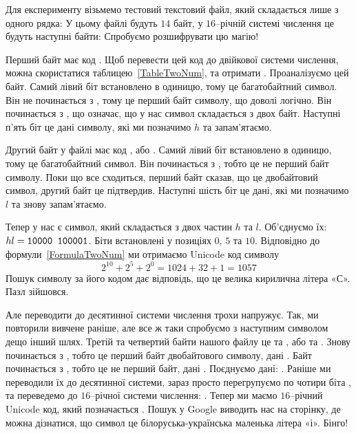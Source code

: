 Для експерименту візьмемо тестовий текстовий файл, який складається лише з одного рядка:
\noindent У цьому файлі будуть $14$ байт, у $16$--річній системі числення це будуть наступні байти:
\noindent Спробуємо розшифрувати цю магію!

Перший байт має код .
Щоб перевести цей код до двійкової системи числення, можна скористатися таблицею~\ref{TableTwoNum}, та отримати .
Проаналізуємо цей байт.
Самий лівий біт встановлено в одиницю, тому це багатобайтний символ.
Він не починається з , тому це перший байт символу, що доволі логічно.
Він починається з , що означає, що у нас символ складається з двох байт.
Наступні п'ять біт  це дані символу, які ми позначимо $h$ та запам'ятаємо.

Другий байт у файлі має код , або .
Самий лівий біт встановлено в одиницю, тому це багатобайтний символ.
Він починається з , тобто це не перший байт символу.
Поки що все сходиться, перший байт сказав, що це двобайтовий символ, другий байт це підтвердив.
Наступні шість біт  це дані, які ми позначимо $l$ та знову запам'ятаємо.

Тепер у нас є символ, який складається з двох частин $h$ та $l$.
Об'єднуємо їх: $hl = \hbox{{\tt 10000 100001}}$.
Біти встановлені у позиціях $0$, $5$ та $10$.
Відповідно до формули~\ref{FormulaTwoNum} ми отримаємо Unicode код символу
\begin{equation}
2^{10} + 2^5 + 2^0 = 1024 + 32 + 1 = 1057
\end{equation}
Пошук символу за його кодом дає відповідь, що це велика кирилична літера «С».
Пазл зійшовся.

Але переводити до десятинної системи числення трохи напружує.
Так, ми повторили вивчене раніше, але все ж таки спробуємо з наступним символом дещо інший шлях.
Третій та четвертий байти нашого файлу це  та , або  та .
Знову  починається з , тобто це перший байт двобайтового символу, дані .
Байт  починається з , тобто це не перший байт, дані .
Поєднуємо дані: .
Раніше ми переводили їх до десятинної системи, зараз просто перегрупуємо по чотири біта , та переведемо до $16$--річної системи числення: .
Тепер ми маємо $16$--річний Unicode код, який позначається .
Пошук у Google виводить нас на сторінку, де можна дізнатися, що символ  це білоруська-українська маленька літера «і».
Бінго!


